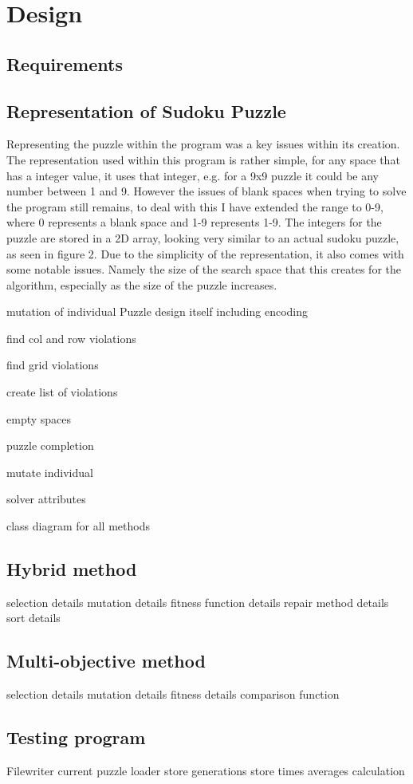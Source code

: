 \documentclass[a4paper,11pt]{article}
\begin{document}
\section{Design}

\subsection{Requirements}

\subsection{Representation of Sudoku Puzzle}
Representing the puzzle within the program was a key issues within its creation. The representation used within this program is rather simple, for any space that has a integer value, it uses that integer, e.g. for a 9x9 puzzle it could be any number between 1 and 9. However the issues of blank spaces when trying to solve the program still remains, to deal with this I have extended the range to 0-9, where 0 represents a blank space and 1-9 represents 1-9. The integers for the puzzle are stored in a 2D array, looking very similar to an actual sudoku puzzle, as seen in figure 2.
Due to the simplicity of the representation, it also comes with some notable issues. Namely the size of the search space that this creates for the algorithm, especially as the size of the puzzle increases. 

mutation of individual
Puzzle design itself including encoding

find col and row violations

find grid violations

create list of violations

empty spaces

puzzle completion

mutate individual

solver attributes

class diagram for all methods
\subsection{Hybrid method}
selection details
mutation details
fitness function details
repair method details
sort details


\subsection{Multi-objective method}
selection details
mutation details
fitness details
comparison function


\subsection{Testing program }
Filewriter
current puzzle loader
store generations
store times
averages calculation
\end{document}

